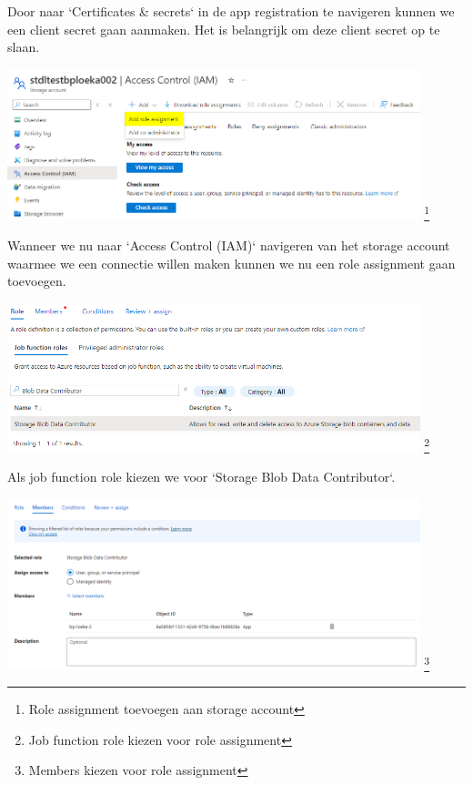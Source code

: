 Door naar `Certificates \& secrets` in de app registration te navigeren kunnen we een client secret gaan aanmaken. Het is belangrijk om deze client secret op te slaan.

\begin{center}
    \includegraphics[width=0.9\textwidth]{./graphics/databricks/connection_4.png}
    \footnote{Role assignment toevoegen aan storage account}
\end{center}

Wanneer we nu naar `Access Control (IAM)` navigeren van het storage account waarmee we een connectie willen maken kunnen we nu een role assignment gaan toevoegen.

\begin{center}
    \includegraphics[width=0.9\textwidth]{./graphics/databricks/connection_5.png}
    \footnote{Job function role kiezen voor role assignment}
\end{center}

Als job function role kiezen we voor `Storage Blob Data Contributor`.

\begin{center}
    \includegraphics[width=0.9\textwidth]{./graphics/databricks/connection_6.png}
    \footnote{Members kiezen voor role assignment}
\end{center}

